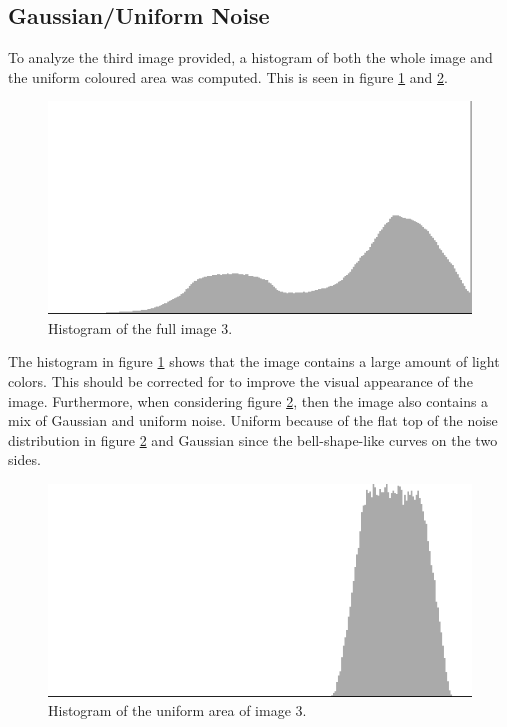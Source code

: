 \subsection{Gaussian/Uniform Noise}
To analyze the third image provided, a histogram of both the whole image and the uniform coloured area was computed.
This is seen in figure \ref{fig:hist_pre_im03} and \ref{fig:hist_uni_im03}.


\begin{figure}[H]
\centering
\includegraphics[width= \histogramWidth]{../code/images/histogram_full_pre_03}
\caption{Histogram of the full image 3.}
\label{fig:hist_pre_im03}
\end{figure}

The histogram in figure \ref{fig:hist_pre_im03} shows that the image contains a large amount of light colors.
This should be corrected for to improve the visual appearance of the image.
Furthermore, when considering figure \ref{fig:hist_uni_im03}, then the image also contains a mix of Gaussian and uniform noise.
Uniform because of the flat top of the noise distribution in figure \ref{fig:hist_uni_im03} and Gaussian since the bell-shape-like curves on the two sides.


\begin{figure}[H]
\centering
\includegraphics[width= \histogramWidth]{../code/images/histogram_uniform_03}
\caption{Histogram of the uniform area of image 3.}
\label{fig:hist_uni_im03}
\end{figure}


